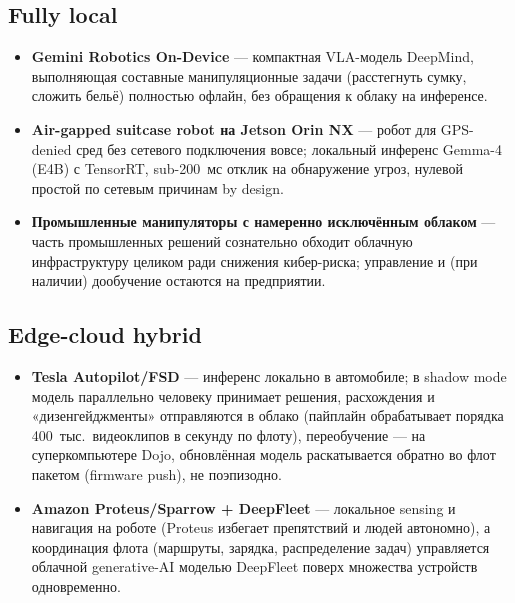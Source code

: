 \documentclass[11pt]{article}
\begin{document}
\subsection*{Fully local}
\begin{itemize}
  \item \textbf{Gemini Robotics On-Device} \cite{geminiondevice2026} — компактная
        VLA-модель DeepMind, выполняющая составные манипуляционные задачи
        (расстегнуть сумку, сложить бельё) полностью офлайн, без обращения к облаку
        на инференсе.
  \item \textbf{Air-gapped suitcase robot на Jetson Orin NX} \cite{jetsonairgapped2026}
        — робот для GPS-denied сред без сетевого подключения вовсе; локальный
        инференс Gemma-4 (E4B) с TensorRT, sub-200~мс отклик на обнаружение угроз,
        нулевой простой по сетевым причинам by design.
  \item \textbf{Промышленные манипуляторы с намеренно исключённым облаком}
        \cite{automateorg2026} — часть промышленных решений сознательно обходит
        облачную инфраструктуру целиком ради снижения кибер-риска; управление и
        (при наличии) дообучение остаются на предприятии.
\end{itemize}

\subsection*{Edge-cloud hybrid}
\begin{itemize}
  \item \textbf{Tesla Autopilot/FSD} \cite{teslafsd2026} — инференс локально в
        автомобиле; в shadow mode модель параллельно человеку принимает решения,
        расхождения и «дизенгейджменты» отправляются в облако (пайплайн обрабатывает
        порядка 400~тыс.\ видеоклипов в секунду по флоту), переобучение — на
        суперкомпьютере Dojo, обновлённая модель раскатывается обратно во флот
        пакетом (firmware push), не поэпизодно.
  \item \textbf{Amazon Proteus/Sparrow + DeepFleet} \cite{amazondeepfleet2026} —
        локальное sensing и навигация на роботе (Proteus избегает препятствий и людей
        автономно), а координация флота (маршруты, зарядка, распределение задач)
        управляется облачной generative-AI моделью DeepFleet поверх множества
        устройств одновременно.
\end{itemize}
\end{document}
